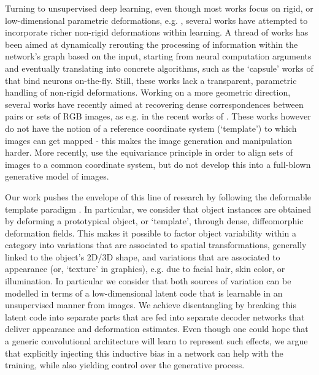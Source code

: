 \documentclass[runningheads]{llncs}
\begin{document}
Turning to unsupervised deep learning, even though most works focus on rigid, or low-dimensional parametric deformations, e.g. \cite{hinton10,WorrallGTB16},
several works have attempted to incorporate richer non-rigid deformations within learning. A thread of works has been aimed at dynamically rerouting the processing of information within the network's graph based on the input, starting from neural computation arguments
\cite{Hinton81,OlshausenAE95,vdm81}
and eventually translating into concrete algorithms, such as the `capsule' works of \cite{Hinton11,Hinton17} that bind neurons on-the-fly. Still, these works lack a transparent, parametric handling of non-rigid deformations. 
Working on a more geometric direction, several works have recently aimed at recovering dense correspondences between pairs \cite{BristowVL15} or sets of RGB images, as e.g. in the recent works of  \cite{ZhouKAHE16,denseiccv17}.
These works however do not have the notion of
a reference coordinate system (`template') to which images can get mapped - this makes the image generation and manipulation harder. More recently, \cite{ThewlisBV17a} use the equivariance principle in order to align sets of images to a common coordinate system, but do not develop this into a full-blown generative model of images. 


Our work pushes the envelope of this line of research by following the deformable template paradigm \cite{Grenander1991,yuille1991deformable,cootes1998active,BlVe03,MaBa04}. In particular, we consider that object instances are obtained by deforming a prototypical object, or `template', through dense, diffeomorphic deformation fields.  
This makes it possible to factor object variability within a category into variations that are associated to  spatial transformations, generally linked to the object's 2D/3D shape, and variations that are associated to appearance (or, `texture' in graphics), e.g. due to facial hair, skin color, or illumination. 
In particular we consider that both sources of variation can be modelled in terms of a low-dimensional latent code that is learnable in an unsupervised manner from images. We achieve disentangling by breaking this latent code into separate parts that are fed into separate decoder networks that deliver appearance and deformation estimates. Even though one could hope that a generic convolutional architecture will learn to represent such effects, we argue that explicitly injecting this inductive bias in a network can help with the  training, while also yielding control over the generative process.
\end{document}
